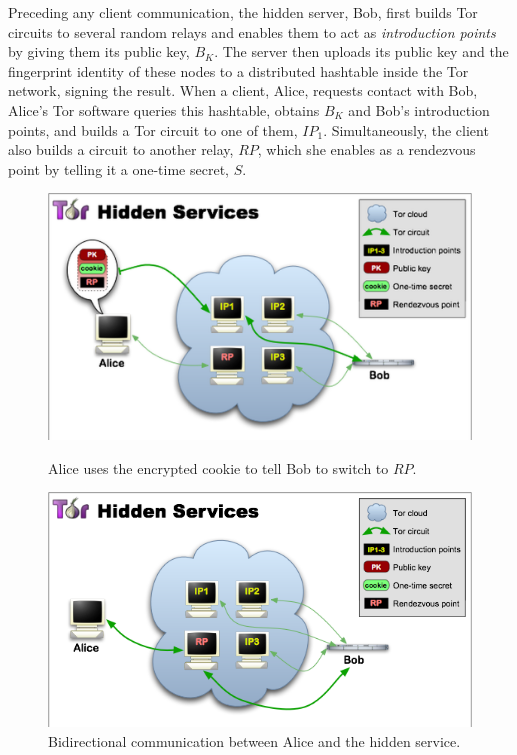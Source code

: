 Preceding any client communication, the hidden server, Bob, first builds Tor circuits to several random relays and enables them to act as \textit{introduction points} by giving them its public key, $B_{K}$. The server then uploads its public key and the fingerprint identity of these nodes to a distributed hashtable inside the Tor network, signing the result. When a client, Alice, requests contact with Bob, Alice's Tor software queries this hashtable, obtains $B_{K}$ and Bob's introduction points, and builds a Tor circuit to one of them, $IP_{1}$. Simultaneously, the client also builds a circuit to another relay, $RP$, which she enables as a rendezvous point by telling it a one-time secret, $S$.

\begin{figure}[htdp]
	\begin{minipage}[b]{0.45\linewidth}
		\centering
		\includegraphics[width=\textwidth]{images/tor-hidden-service-4-higher.png}
		\caption{Alice uses the encrypted cookie to tell Bob to switch to $RP$.}
		\label{fig:figure4}
	\end{minipage}
	\hspace{0.5cm}
	\begin{minipage}[b]{0.45\linewidth}
		\centering
		\includegraphics[width=\textwidth]{images/tor-hidden-service-6.png}
		\caption{Bidirectional communication between Alice and the hidden service.}
		\label{fig:figure5}
	\end{minipage}
\end{figure}

